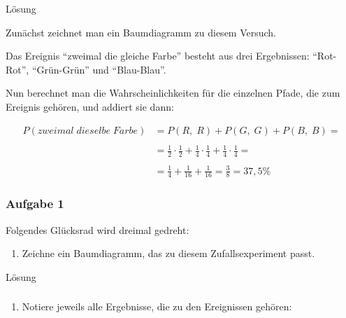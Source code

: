 \documentclass[
  ngerman,
]{book}
\providecommand{\tightlist}{%
  \setlength{\itemsep}{0pt}\setlength{\parskip}{0pt}}
\begin{document}
Lösung

Zunächst zeichnet man ein Baumdiagramm zu diesem Versuch.

Das Ereignis ``zweimal die gleiche Farbe'' besteht aus drei Ergebnissen: ``Rot-Rot'', ``Grün-Grün'' und ``Blau-Blau''.

Nun berechnet man die Wahrscheinlichkeiten für die einzelnen Pfade, die zum Ereignis gehören, und addiert sie dann:

\[\begin{align} P(zweimal\;dieselbe\;Farbe) &= P(R,\;R)+P(G,\;G)+P(B,\;B) =\\
{}\\
                                            & = \frac{1}{2} \cdot \frac{1}{2} + \frac{1}{4} \cdot \frac{1}{4} + \frac{1}{4} \cdot \frac{1}{4} = \\
                                            {}\\
                                            &= \frac{1}{4} + \frac{1}{16} + \frac{1}{16} = \frac{3}{8} = 37,5\% \end{align}\]

\hypertarget{section-124}{%
\subsubsection*{}\label{section-124}}

\hypertarget{aufgabe-1-13}{%
\subsubsection*{Aufgabe 1}\label{aufgabe-1-13}}

Folgendes Glücksrad wird dreimal gedreht:

\begin{enumerate}
\def\labelenumi{\alph{enumi})}
\tightlist
\item
  Zeichne ein Baumdiagramm, das zu diesem Zufallsexperiment passt.
\end{enumerate}

Lösung

\hypertarget{section-125}{%
\subsubsection*{}\label{section-125}}

\begin{enumerate}
\def\labelenumi{\alph{enumi})}
\setcounter{enumi}{1}
\tightlist
\item
  Notiere jeweils alle Ergebnisse, die zu den Ereignissen gehören:
\end{enumerate}
\end{document}
